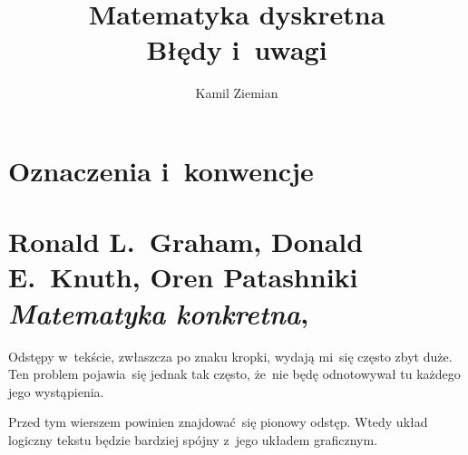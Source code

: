 \documentclass[a4paper,11pt]{article}
\title{Matematyka dyskretna \\
  {\Large Błędy i~uwagi}}
\author{Kamil Ziemian}
\numberwithin{equation}{section}
\begin{document}





\maketitle









\section{Oznaczenia i~konwencje}

\label{sec:Oznaczenia-i-konwencje}










\section{Ronald L.~Graham, Donald E.~Knuth, Oren Patashniki
  \textit{Matematyka konkretna},
  \cite{Graham-Knuth-Patashnik-Matematyka-Konkretna-Wyd-2012}}

\label{sec:Graham-Knuth-Patashnik-Matematyka-konkretna}



\vspace{0em}


Odstępy w~tekście, zwłaszcza po znaku kropki, wydają mi~się często zbyt duże.
Ten problem pojawia~się jednak tak często, że~nie będę odnotowywał tu
każdego jego wystąpienia.











\vspace{0em}


\noindent
{} Przed tym wierszem powinien znajdować~się pionowy
odstęp. Wtedy układ logiczny tekstu będzie bardziej spójny z~jego układem
graficznym.
\end{document}
